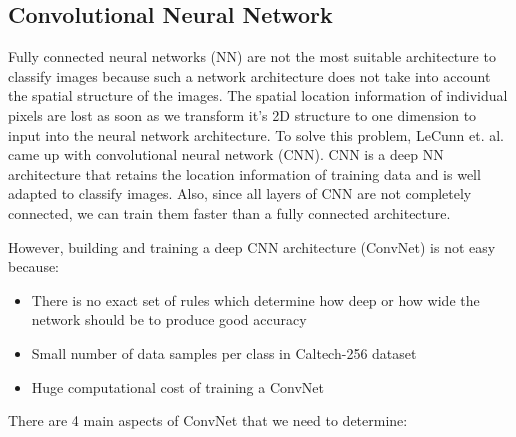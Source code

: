 \documentclass{article} %
\begin{document}
\subsection{Convolutional Neural Network}
Fully connected neural networks (NN) are not the most suitable architecture to classify images because such a network architecture does not take into account the spatial structure of the images. The spatial location information of individual pixels are lost as soon as we transform it's 2D structure to one dimension to input into the neural network architecture. To solve this problem, LeCunn et. al. came up with convolutional neural network (CNN). CNN is a deep NN architecture that retains the location information of training data and is well adapted to classify images. Also, since all layers of CNN are not completely connected, we can train them faster than a fully connected architecture. 
\par However, building and training a deep CNN architecture (ConvNet) is not easy because:

\begin{itemize}
\item
There is no exact set of rules which determine how deep or how wide the network should be to produce good accuracy
\item
Small number of data samples per class in Caltech-256 dataset
\item
Huge computational cost of training a ConvNet
\end{itemize}

There are 4 main aspects of ConvNet that we need to determine:
\end{document}
